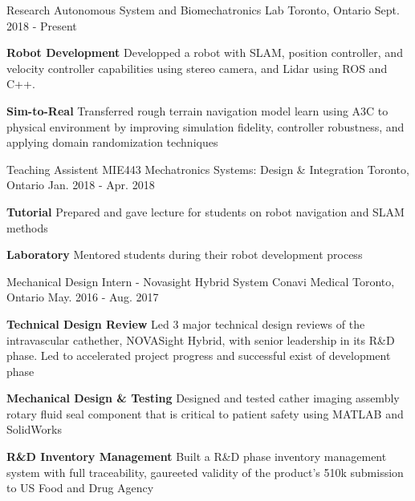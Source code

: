 \begin{cventries}
  \cventry
    {Research}
    {Autonomous System and Biomechatronics Lab}
    {Toronto, Ontario}
    {Sept. 2018 - Present}
    {
      \begin{cvitems}
        \item {
          \textbf{Robot Development} Developped a robot with SLAM, position controller, and velocity controller capabilities using stereo camera, and Lidar using ROS and C++. 
        }
        \item {
          \textbf{Sim-to-Real} Transferred rough terrain navigation model learn using A3C to physical environment by improving simulation fidelity, controller robustness, and applying domain randomization techniques
        }
      \end{cvitems}
    }
  \cventry
    {Teaching Assistent}
    {MIE443 Mechatronics Systems: Design \& Integration}
    {Toronto, Ontario}
    {Jan. 2018 - Apr. 2018}
    {
      \begin{cvitems}
        \item {
          \textbf{Tutorial} Prepared and gave lecture for students on robot navigation and SLAM methods
        }
        \item {
          \textbf{Laboratory} Mentored students during their robot development process
        }
      \end{cvitems}
    }
  \cventry
    {Mechanical Design Intern - Novasight Hybrid System}
    {Conavi Medical}
    {Toronto, Ontario}
    {May. 2016 - Aug. 2017}
    {
      \begin{cvitems}
        \item {
          \textbf{Technical Design Review} Led 3 major technical design reviews of the intravascular cathether, NOVASight Hybrid, with senior leadership in its R\&D phase. Led to accelerated project progress and successful exist of development phase
        }
        \item {
            \textbf{Mechanical Design \& Testing} Designed and tested cather imaging assembly rotary fluid seal component that is critical to patient safety using MATLAB and SolidWorks
        }
        \item {
            \textbf{R\&D Inventory Management} Built a R\&D phase inventory management system with full traceability, gaureeted validity of the product's 510k submission to US Food and Drug Agency
        }
      \end{cvitems}
    }  
\end{cventries}
